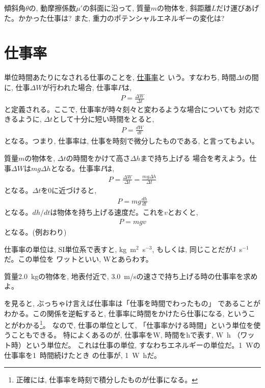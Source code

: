 \begin{q}\label{q:slope_lift_energy2}
傾斜角$\theta$の, 動摩擦係数$\mu'$の斜面に沿って, 質量$m$の物体を, 
斜距離$L$だけ運びあげた。かかった仕事は? また, 重力のポテンシャルエネルギーの変化は? 
\end{q}
\hv


\section{仕事率}
単位時間あたりになされる仕事のことを, \underline{仕事率}と
いう。すなわち, 時間$\Delta t$の間に, 仕事$\Delta W$が行われた場合, 仕事率$P$は, 
\begin{eqnarray}P = \frac{\Delta W}{\Delta t}\label{eq:work_rate0}\end{eqnarray}
と定義される。ここで, 仕事率が時々刻々と変わるような場合についても
対応できるように, $\Delta t$として十分に短い時間をとると, 
\begin{eqnarray}P = \frac{dW}{dt}\end{eqnarray}
となる。つまり, 仕事率は, 仕事を時刻で微分したものである, と言ってもよい。\mv

\begin{exmpl}
質量$m$の物体を, $\Delta t$の時間をかけて高さ$\Delta h$まで持ち上げる
場合を考えよう。仕事$\Delta W$は$mg\Delta h$となる。仕事率$P$は, 
\begin{eqnarray}P= \frac{\Delta W}{\Delta t}= \frac{mg \Delta h}{\Delta t}\end{eqnarray}
となる。$\Delta t$を0に近づけると, 
\begin{eqnarray}P= mg\frac{dh}{dt}\end{eqnarray}
となる。$dh/dt$は物体を持ち上げる速度だ。これを$v$とおくと, 
\begin{eqnarray}P= mgv\label{eq:work_rate_lift}\end{eqnarray}
となる。(例おわり)
\end{exmpl}

仕事率の単位は, SI単位系で表すと, kg~m$^2$~s$^{-3}$, もしくは, 同じことだがJ~s$^{-1}$だ。この単位を
ワットといい, Wとあらわす。\mv

\begin{q}\label{q:work_rate}
質量2.0~kgの物体を, 地表付近で, 3.0~m/sの速さで持ち上げる時の仕事率を求めよ。
\end{q}

を見ると, ぶっちゃけ言えば仕事率は「仕事を時間でわったもの」
であることがわかる。この関係を逆転すると, 仕事率に時間をかけたら仕事になる, 
ということがわかる\footnote{正確には, 仕事率を時刻で積分したものが仕事になる。}。
なので, 仕事の単位として, 「仕事率かける時間」という単位を使うこともできる。
特によくあるのが, 仕事率をW, 時間をhで表す, W~h （ワット時）という単位だ。
これは仕事の単位, すなわちエネルギーの単位だ。1~Wの仕事率を1~時間続けたとき
の仕事が, 1~W~hだ。

